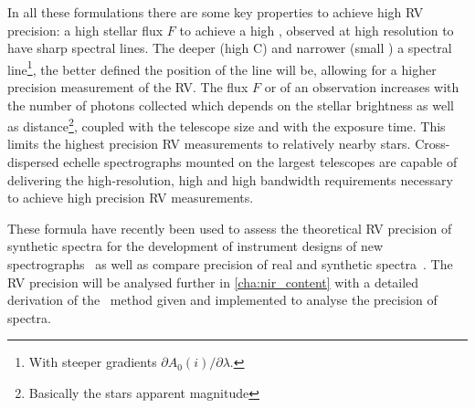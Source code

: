 In all these formulations there are some key properties to achieve high {RV} precision: a high stellar flux $F$ to achieve a high \snr{}, observed at high resolution to have sharp spectral lines.
The deeper (high C) and narrower (small \fwhm{}) a spectral line\footnote{With steeper gradients $\partial A_0(i)/\partial\lambda$.}, the better defined the position of the line will be, allowing for a higher precision measurement of the {RV}.
The flux $F$ or \snr{} of an observation increases with the number of photons collected which depends on the stellar brightness as well as distance\footnote{Basically the stars apparent magnitude}, coupled with the telescope size and with the exposure time.
This limits the highest precision {RV} measurements to relatively nearby stars.
Cross-dispersed echelle spectrographs mounted on the largest telescopes are capable of delivering the high-resolution, high \snr{} and high bandwidth requirements necessary to achieve high precision {RV} measurements.

These formula have recently been used to assess the theoretical {RV} precision of synthetic spectra for the development of instrument designs of new \nir{} spectrographs~\citep[e.g.][]{figueira_radial_2016} as well as compare precision of real and synthetic spectra~\citep[e.g.][]{artigau_optical_2018}.
The {RV} precision will be analysed further in \cref{cha:nir_content} with a detailed derivation of the~\citet{bouchy_fundamental_2001} method given and implemented to analyse the precision of \nir{} spectra.
